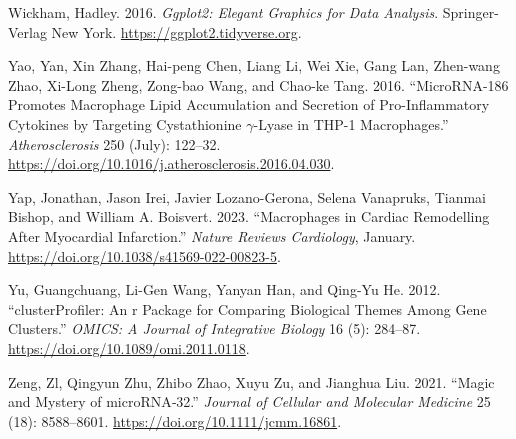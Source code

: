 \documentclass[smallextended]{svjour3}       %
\newlength{\cslhangindent}
\newlength{\cslentryspacingunit} %
\newenvironment{CSLReferences}[2] %
 {%
  \setlength{\parindent}{0pt}
  \ifodd #1
  \let\oldpar\par
  \def\par{\hangindent=\cslhangindent\oldpar}
  \fi
  \setlength{\parskip}{#2\cslentryspacingunit}
 }%
 {}
\begin{document}
\begin{CSLReferences}{1}{0}
\leavevmode{}%
Wickham, Hadley. 2016. \emph{Ggplot2: Elegant Graphics for Data
Analysis}. Springer-Verlag New York.
\url{https://ggplot2.tidyverse.org}.

\leavevmode{}%
Yao, Yan, Xin Zhang, Hai-peng Chen, Liang Li, Wei Xie, Gang Lan,
Zhen-wang Zhao, Xi-Long Zheng, Zong-bao Wang, and Chao-ke Tang. 2016.
{``{MicroRNA}-186 Promotes Macrophage Lipid Accumulation and Secretion
of Pro-Inflammatory Cytokines by Targeting Cystathionine
\(\gamma\)-Lyase in {THP}-1 Macrophages.''} \emph{Atherosclerosis} 250
(July): 122--32.
\url{https://doi.org/10.1016/j.atherosclerosis.2016.04.030}.

\leavevmode{}%
Yap, Jonathan, Jason Irei, Javier Lozano-Gerona, Selena Vanapruks,
Tianmai Bishop, and William A. Boisvert. 2023. {``Macrophages in Cardiac
Remodelling After Myocardial Infarction.''} \emph{Nature Reviews
Cardiology}, January. \url{https://doi.org/10.1038/s41569-022-00823-5}.

\leavevmode{}%
Yu, Guangchuang, Li-Gen Wang, Yanyan Han, and Qing-Yu He. 2012.
{``clusterProfiler: An r Package for Comparing Biological Themes Among
Gene Clusters.''} \emph{OMICS: A Journal of Integrative Biology} 16 (5):
284--87. \url{https://doi.org/10.1089/omi.2011.0118}.

\leavevmode{}%
Zeng, Zl, Qingyun Zhu, Zhibo Zhao, Xuyu Zu, and Jianghua Liu. 2021.
{``Magic and Mystery of {microRNA}‐32.''} \emph{Journal of Cellular and
Molecular Medicine} 25 (18): 8588--8601.
\url{https://doi.org/10.1111/jcmm.16861}.

\end{CSLReferences}




\end{document}

